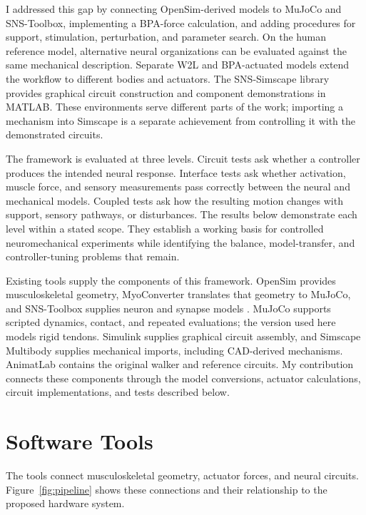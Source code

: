 I addressed this gap by connecting OpenSim-derived models to MuJoCo and SNS-Toolbox, implementing a BPA-force calculation, and adding procedures for support, stimulation, perturbation, and parameter search. On the human reference model, alternative neural organizations can be evaluated against the same mechanical description. Separate W2L and BPA-actuated models extend the workflow to different bodies and actuators. The SNS-Simscape library provides graphical circuit construction and component demonstrations in MATLAB. These environments serve different parts of the work; importing a mechanism into Simscape is a separate achievement from controlling it with the demonstrated circuits.

The framework is evaluated at three levels. Circuit tests ask whether a controller produces the intended neural response. Interface tests ask whether activation, muscle force, and sensory measurements pass correctly between the neural and mechanical models. Coupled tests ask how the resulting motion changes with support, sensory pathways, or disturbances. The results below demonstrate each level within a stated scope. They establish a working basis for controlled neuromechanical experiments while identifying the balance, model-transfer, and controller-tuning problems that remain.

Existing tools supply the components of this framework. OpenSim provides musculoskeletal geometry, MyoConverter translates that geometry to MuJoCo, and SNS-Toolbox supplies neuron and synapse models \citep{delp_opensim_2007, caggiano_myosuite_2022, todorov_mujoco_2012, nourse_sns_2023}. MuJoCo supports scripted dynamics, contact, and repeated evaluations; the version used here models rigid tendons. Simulink supplies graphical circuit assembly, and Simscape Multibody supplies mechanical imports, including CAD-derived mechanisms. AnimatLab contains the original walker and reference circuits. My contribution connects these components through the model conversions, actuator calculations, circuit implementations, and tests described below.

\section{Software Tools}\label{sec:preliminary_sim_methods}

The tools connect musculoskeletal geometry, actuator forces, and neural circuits. Figure~\ref{fig:pipeline} shows these connections and their relationship to the proposed hardware system.

